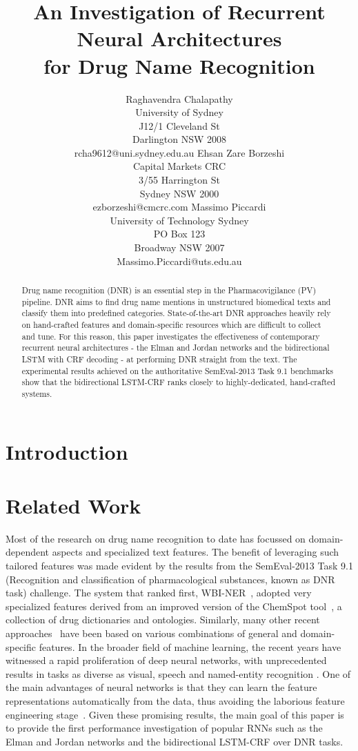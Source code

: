 \documentclass[11pt,letterpaper]{article}
\title{An Investigation of Recurrent  Neural  Architectures \\ for Drug Name Recognition}
\author{Raghavendra  Chalapathy \\ University of Sydney\\
 	J12/1  Cleveland St \\ Darlington NSW 2008 \\ rcha9612@uni.sydney.edu.au
         \And
         Ehsan Zare Borzeshi  \\ Capital Markets CRC\\
         3/55 Harrington St \\Sydney NSW 2000 \\ ezborzeshi@cmcrc.com
         \And
         Massimo Piccardi \\University of Technology Sydney \\ PO Box 123 \\  Broadway NSW 2007 \\
         Massimo.Piccardi@uts.edu.au
         }
\begin{document}
\maketitle

\begin{abstract}
Drug name recognition (DNR) is an essential step in the Pharmacovigilance (PV) pipeline. DNR aims to find drug name mentions in unstructured biomedical texts and classify them into predefined categories. State-of-the-art DNR approaches heavily rely on hand-crafted features and domain-specific resources which are difficult to collect and tune. For this reason, this paper investigates the effectiveness of contemporary recurrent neural architectures - the Elman and Jordan networks and the bidirectional LSTM with CRF decoding - at performing DNR straight from the text. The experimental results achieved on the authoritative SemEval-2013 Task 9.1 benchmarks show that the bidirectional LSTM-CRF ranks closely to highly-dedicated, hand-crafted systems.
\end{abstract}

\section{Introduction}


\section{Related Work}
Most of the research on drug name recognition to date has focussed on domain-dependent aspects and specialized text features. The benefit of leveraging such tailored features was made evident by the results from the SemEval-2013 Task 9.1 (Recognition and classification of pharmacological substances, known as DNR task) challenge. The system that ranked first, WBI-NER~\cite{huber2013wbi}, adopted very specialized features derived from an improved version of the ChemSpot tool~\cite{rocktaschel2012chemspot}, a collection of drug dictionaries and ontologies. Similarly, many other recent approaches~\cite{abacha2015text,liu2015feature,segura2015exploring} have been based on various combinations of general and domain-specific features. In the broader field of machine learning, the recent years have witnessed a rapid proliferation of deep neural networks, with unprecedented results in tasks as diverse as visual, speech and named-entity recognition \cite{hinton2012deep,krizhevsky2012imagenet,lample2016neural}. One of the main advantages of neural networks is that they can learn the feature representations automatically from the data, thus avoiding the laborious feature engineering stage~\cite{mesnil2015using,lample2016neural}. Given these promising results, the main goal of this paper is to provide the first performance investigation of popular RNNs such as the Elman and Jordan networks and the bidirectional LSTM-CRF over DNR tasks.
\end{document}

